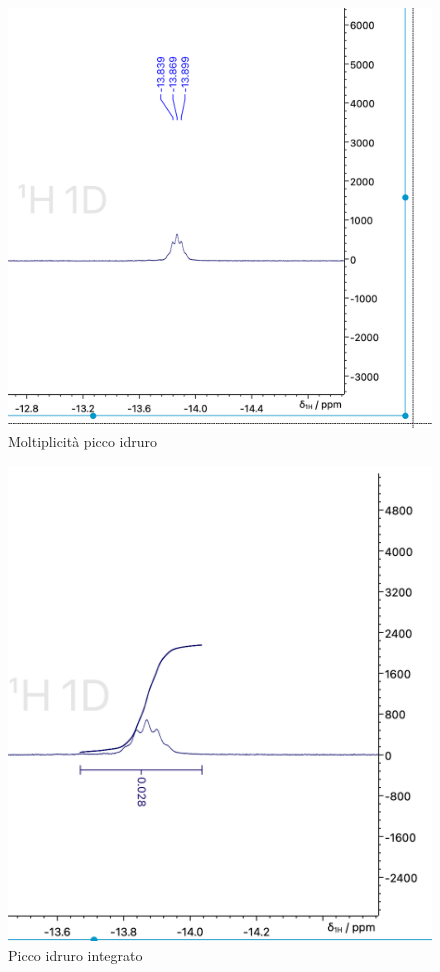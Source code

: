 \begin{figure}[h!]
    \centering
    \includegraphics[width=0.6\linewidth]{Relazione/foto/CoH_hydridepeak_calc.png}
    \caption{Moltiplicità picco idruro}
    \label{fig:my_label}
\end{figure}
\begin{figure}[h!]
    \centering
    \includegraphics[width=0.6\linewidth]{Relazione/foto/CoH_hydridepeak_right.png}
    \caption{Picco idruro integrato}
    \label{fig:my_label}
\end{figure}



\clearpage